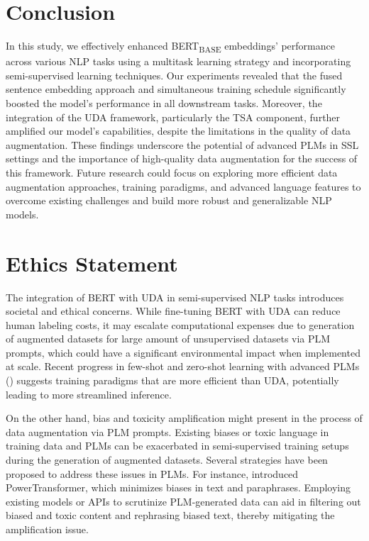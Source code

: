 \documentclass{article}
\begin{document}
\section{Conclusion}
In this study, we effectively enhanced BERT\textsubscript{BASE} embeddings' performance across 
various NLP tasks using a multitask learning strategy and incorporating semi-supervised learning 
techniques. Our experiments revealed that the fused sentence embedding approach and simultaneous 
training schedule significantly boosted the model's performance in all downstream tasks. 
Moreover, the integration of the UDA framework, particularly the TSA component, further 
amplified our model's capabilities, despite the limitations in the quality of data augmentation. 
These findings underscore the potential of advanced PLMs in SSL settings and the importance of 
high-quality data augmentation for the success of this framework. Future research could focus 
on exploring more efficient data augmentation approaches, training paradigms, and advanced 
language features to overcome existing challenges and build more robust and 
generalizable NLP models.

\section{Ethics Statement}
The integration of BERT with UDA in semi-supervised NLP tasks introduces societal and ethical  
concerns. While fine-tuning BERT with UDA can reduce human labeling costs, it may escalate 
computational expenses due to generation of augmented datasets for large amount of 
unsupervised datasets via PLM prompts,
which could have a significant environmental impact when implemented at scale.
Recent progress in few-shot and zero-shot learning with advanced PLMs 
(\cite{meng2022generating,wang2021zerolabel}) suggests training paradigms that are more 
efficient than UDA, potentially leading to more streamlined inference.

On the other hand, bias and toxicity amplification might present in the process of 
data augmentation via PLM prompts. 
Existing biases or toxic language 
in training data and PLMs can be exacerbated in semi-supervised training setups during the 
generation of augmented datasets. Several strategies have been proposed to address these issues 
in PLMs. For instance, \cite{ma-etal-2020-powertransformer} introduced PowerTransformer, which 
minimizes biases in text and paraphrases. Employing existing models or APIs to scrutinize PLM-generated data can aid in filtering out 
biased and toxic content and rephrasing biased text, thereby mitigating the amplification issue.
\end{document}
